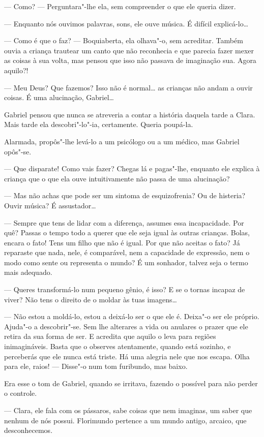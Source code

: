 --- Como? --- Perguntara"-lhe ela, sem compreender o que ele queria dizer.

--- Enquanto nós ouvimos palavras, sons, ele ouve música. É difícil
explicá-lo\ldots{}

--- Como é que o faz? --- Boquiaberta, ela olhava"-o, sem acreditar. Também
ouvia a criança trautear um canto que não reconhecia e que parecia fazer
mexer as coisas à sua volta, mas pensou que isso não passava de
imaginação sua. Agora aquilo?!

--- Meu Deus? Que fazemos? Isso não é normal\ldots{} as crianças não andam a
ouvir coisas. É uma alucinação, Gabriel\ldots{}

Gabriel pensou que nunca se atreveria a contar a história daquela tarde
a Clara. Mais tarde ela descobri"-lo"-ia, certamente. Queria poupá-la.

Alarmada, propôs"-lhe levá-lo a um psicólogo ou a um médico, mas Gabriel
opôs"-se.

--- Que disparate! Como vais fazer? Chegas lá e pagas"-lhe, enquanto ele
explica à criança que o que ela ouve intuitivamente não passa de uma
alucinação?

--- Mas não achas que pode ser um sintoma de esquizofrenia? Ou de
histeria? Ouvir música? É assustador\ldots{}

--- Sempre que tens de lidar com a diferença, assumes essa incapacidade.
Por quê? Passas o tempo todo a querer que ele seja igual às outras
crianças. Bolas, encara o fato! Tens um filho que não é igual. Por que
não aceitas o fato? Já reparaste que nada, nele, é comparável, nem a
capacidade de expressão, nem o modo como sente ou representa o mundo? É
um sonhador, talvez seja o termo mais adequado.

--- Queres transformá-lo num pequeno gênio, é isso? E se o tornas incapaz
de viver? Não tens o direito de o moldar às tuas imagens\ldots{}

--- Não estou a moldá-lo, estou a deixá-lo ser o que ele é. Deixa"-o ser
ele próprio. Ajuda"-o a descobrir"-se. Sem lhe alterares a vida ou
anulares o prazer que ele retira da sua forma de ser. E acredita que
aquilo o leva para regiões inimagináveis. Basta que o observes
atentamente, quando está sozinho, e perceberás que ele nunca está
triste. Há uma alegria nele que nos escapa. Olha para ele, raios! ---
Disse"-o num tom furibundo, mas baixo.

Era esse o tom de Gabriel, quando se irritava, fazendo o possível para
não perder o controle.

--- Clara, ele fala com os pássaros, sabe coisas que nem imaginas, um
saber que nenhum de nós possui. Florimundo pertence a um mundo antigo,
arcaico, que desconhecemos.

